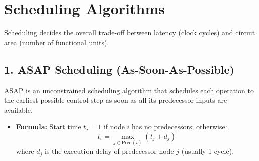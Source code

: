 \documentclass[12pt,a4paper]{article}
\begin{document}
\begin{tcolorbox}[tikzbox, title={Data Flow Graph for $y = (a + b) \cdot (c - d)$}]
\centering
{}
\end{tcolorbox}

\section{Scheduling Algorithms}

Scheduling decides the overall trade-off between latency (clock cycles) and circuit area (number of functional units).

\subsection{1. ASAP Scheduling (As-Soon-As-Possible)}
ASAP is an unconstrained scheduling algorithm that schedules each operation to the earliest possible control step as soon as all its predecessor inputs are available.
\begin{itemize}[leftmargin=*, itemsep=2pt]
  \item \textbf{Formula:} Start time $t_i = 1$ if node $i$ has no predecessors; otherwise:
        \begin{equation}
          t_i = \max_{j \in \text{Pred}(i)} (t_j + d_j)
        \end{equation}
        where $d_j$ is the execution delay of predecessor node $j$ (usually 1 cycle).
\end{itemize}
\end{document}
